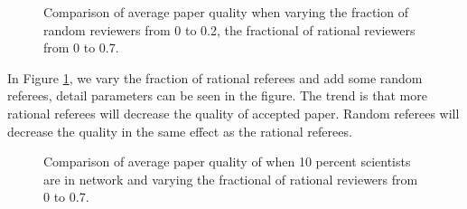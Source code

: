 \documentclass[11pt]{article}
\begin{document}
\begin{figure}[H]
    \begin{center}
    \caption{Comparison of average paper quality when varying the fraction of random reviewers from 0 to 0.2, the fractional of rational reviewers from 0 to 0.7.}
    \label{fig:t3}
    \end{center}
\end{figure}

In Figure \ref{fig:t3}, we vary the fraction of rational referees and add some random referees, detail parameters can be seen in the figure. The trend is that more rational referees will decrease the quality of accepted paper. Random referees will decrease the quality in the same effect as the rational referees.

\begin{figure}[H]
    \begin{center}
    \caption{Comparison of average paper quality of when 10 percent scientists are in network and varying the fractional of rational reviewers from 0 to 0.7.}
    \label{fig:t4}
    \end{center}
\end{figure}
\end{document}
